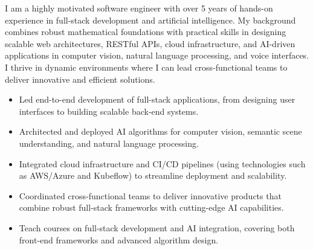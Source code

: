 \documentclass[10pt,a4paper]{altacv}
\begin{document}
\begin{CJK*}{UTF8}{bsmi}


\begin{fullwidth}
\makecvheader
\end{fullwidth}

I am a highly motivated software engineer with over 5 years of hands-on experience in full-stack development and artificial intelligence. My background combines robust mathematical foundations with practical skills in designing scalable web architectures, RESTful APIs, cloud infrastructure, and AI-driven applications in computer vision, natural language processing, and voice interfaces. I thrive in dynamic environments where I can lead cross-functional teams to deliver innovative and efficient solutions.


\begin{itemize}
\item Led end-to-end development of full-stack applications, from designing user interfaces to building scalable back-end systems.
\item Architected and deployed AI algorithms for computer vision, semantic scene understanding, and natural language processing.
\item Integrated cloud infrastructure and CI/CD pipelines (using technologies such as AWS/Azure and Kubeflow) to streamline deployment and scalability.
\item Coordinated cross-functional teams to deliver innovative products that combine robust full-stack frameworks with cutting-edge AI capabilities.
\end{itemize}

\divider

\begin{itemize}
\item Teach courses on full-stack development and AI integration, covering both front-end frameworks and advanced algorithm design.
\end{itemize}


\end{CJK*}
\end{document}
